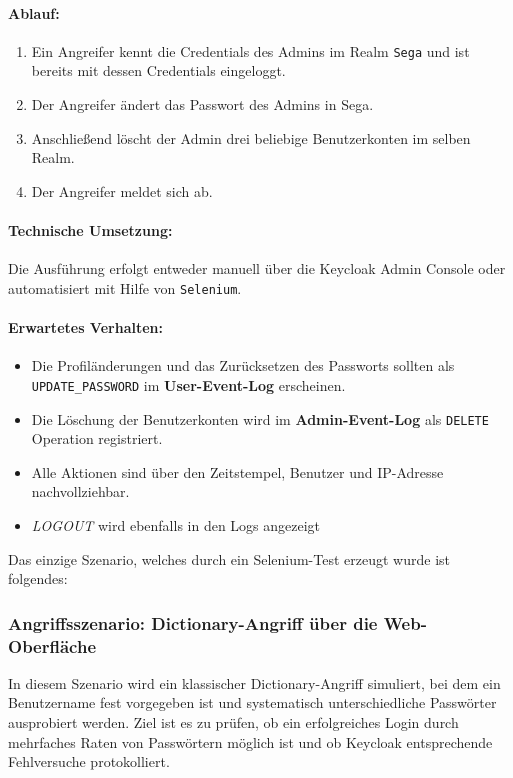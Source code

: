 \documentclass[a4paper,12pt]{article}
\begin{document}
	\paragraph{Ablauf:}
	\begin{enumerate}
		\item Ein Angreifer kennt die Credentials des Admins im Realm \texttt{Sega} und ist bereits mit dessen Credentials eingeloggt.
		\item Der Angreifer ändert das Passwort des Admins in Sega.
		\item Anschließend löscht der Admin drei beliebige Benutzerkonten im selben Realm.
		\item Der Angreifer meldet sich ab.
	\end{enumerate}
	
	\paragraph{Technische Umsetzung:}
	Die Ausführung erfolgt entweder manuell über die Keycloak Admin Console oder automatisiert mit Hilfe von \texttt{Selenium}.
	
	\paragraph{Erwartetes Verhalten:}
	\begin{itemize}
		\item Die Profiländerungen und das Zurücksetzen des Passworts sollten als \texttt{UPDATE\_PASSWORD} im \textbf{User-Event-Log} erscheinen.
		\item Die Löschung der Benutzerkonten wird im \textbf{Admin-Event-Log} als \texttt{DELETE} Operation registriert.
		\item Alle Aktionen sind über den Zeitstempel, Benutzer und IP-Adresse nachvollziehbar.
		\item \textit{LOGOUT} wird ebenfalls in den Logs angezeigt
	\end{itemize}
	
	Das einzige Szenario, welches durch ein Selenium-Test erzeugt wurde ist folgendes:

	\subsubsection{Angriffsszenario: Dictionary-Angriff über die Web-Oberfläche}
	In diesem Szenario wird ein klassischer Dictionary-Angriff simuliert, bei dem ein Benutzername fest vorgegeben ist und systematisch unterschiedliche Passwörter ausprobiert werden. Ziel ist es zu prüfen, ob ein erfolgreiches Login durch mehrfaches Raten von Passwörtern möglich ist und ob Keycloak entsprechende Fehlversuche protokolliert.
	
\end{document}
